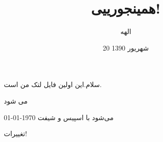 \documentclass{article}
\title{همینجورییی!}
\author{الهه}
\date{20 شهریور 1390}
\begin{document}
\maketitle
	
	سلام.این اولین فایل لتک من است.
	
	 می شود
	
	 می‌شود با اسپیس و شیفت
	 \today
	
	 تغییرات!
	 
	 
\end{document}
